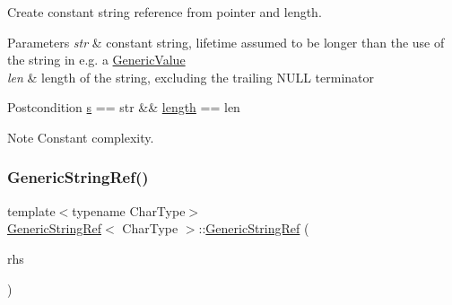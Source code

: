 Create constant string reference from pointer and length. 


\begin{DoxyParams}{Parameters}
{\em str} & constant string, lifetime assumed to be longer than the use of the string in e.\+g. a \hyperlink{classGenericValue}{Generic\+Value} \\
\hline
{\em len} & length of the string, excluding the trailing N\+U\+LL terminator\\
\hline
\end{DoxyParams}
\begin{DoxyPostcond}{Postcondition}
\hyperlink{structGenericStringRef_ac555994afd329bc9bc1780acf2f9d9be}{s} == str \&\& \hyperlink{structGenericStringRef_a4a96d618744ad73f766a1551b1d517fe}{length} == len 
\end{DoxyPostcond}
\begin{DoxyNote}{Note}
Constant complexity. 
\end{DoxyNote}
\mbox{\label{structGenericStringRef_ab049693082c0b8f5066c00212e780aec}} 
\subsubsection{\texorpdfstring{Generic\+String\+Ref()}{GenericStringRef()}\hspace{0.1cm}{\footnotesize\ttfamily [4/5]}}
{\footnotesize\ttfamily template$<$typename Char\+Type$>$ \\
\hyperlink{structGenericStringRef}{Generic\+String\+Ref}$<$ Char\+Type $>$\+::\hyperlink{structGenericStringRef}{Generic\+String\+Ref} (\begin{DoxyParamCaption}\item[{const \hyperlink{structGenericStringRef}{Generic\+String\+Ref}$<$ Char\+Type $>$ \&}]{rhs }\end{DoxyParamCaption})\hspace{0.3cm}{\ttfamily [inline]}}

\mbox{\label{structGenericStringRef_ac0d64ff2d8a84b4f5a4b4dc687f49301}} 
